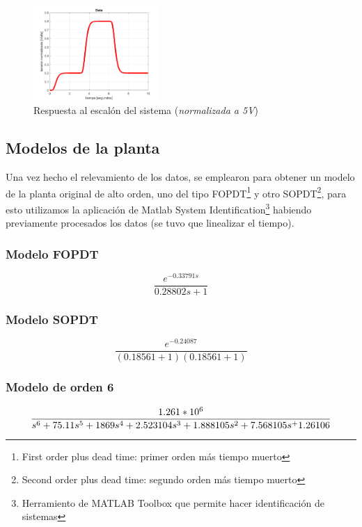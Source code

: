 \documentclass[letterpaper, 10 pt, conference]{ieeeconf}  %
\begin{document}
\begin{figure}[H]
  \centering
  \includegraphics[width=0.43\textwidth]{./imagenes/datos_resp_escalon.png}
  \caption{Respuesta al escalón del sistema (\textit{normalizada a 5V})}
  \label{fig:resp_esc}
\end{figure}

\subsection{Modelos de la planta}
Una vez hecho el relevamiento de los datos, se emplearon para obtener un modelo de la planta original de alto orden, uno del tipo FOPDT\footnote{First order plus dead time: primer orden más tiempo muerto} y otro SOPDT\footnote{Second order plus dead time: segundo orden más tiempo muerto}, para esto utilizamos la aplicación de Matlab System Identification\footnote{Herramiento de MATLAB Toolbox que permite hacer identificación de sistemas} habiendo previamente procesados los datos (se tuvo que linealizar el tiempo).

\subsubsection{Modelo FOPDT}
\begin{equation}
  \frac{e^{-0.33791s}}{0.28802s+1}
\end{equation}

\subsubsection{Modelo SOPDT}
\begin{equation}
  \frac{e^{-0.24087}}{(0.18561+1)(0.18561+1)}
\end{equation}

\subsubsection{Modelo de orden 6}
\begin{equation}
  \tiny{\frac{1.261*10^6}{s^6+75.11s^5+1869s^4+2.523104s^3+1.888105s^2+7.568105s^+1.26106}}
\end{equation}
\end{document}

